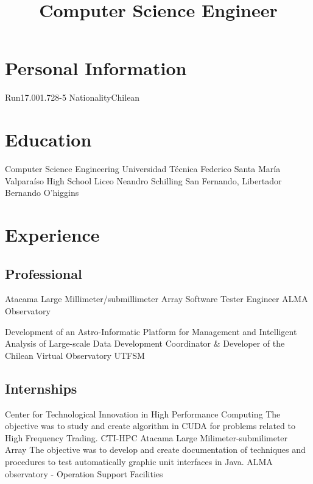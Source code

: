 \documentclass[11pt,a4paper]{moderncv}
\title{Computer Science Engineer}
\begin{document}
\maketitle

\section{Personal Information}
		{Run}{17.001.728-5}
						{Nationality}{Chilean}
							{}{}

\section{Education}
	{Computer Science Engineering}
	{Universidad Técnica Federico Santa María}
	{Valparaíso}
	{}
	{}
	{High School}
	{Liceo Neandro Schilling}
	{San Fernando, Libertador Bernando O'higgins}
	{}{}
\vspace{0.5cm}

\section{Experience}
\subsection{Professional}
	{Atacama Large Millimeter/submillimeter Array}
	{Software Tester Engineer}
	{ALMA Observatory}
	{}{}

	{Development of an Astro-Informatic Platform for Management and Intelligent Analysis of Large-scale Data}
	{Development Coordinator \& Developer of the Chilean Virtual Observatory}
	{UTFSM}
	{}{}

\subsection{Internships}
	{Center for Technological Innovation in High Performance Computing}
	{The objective was to study and create algorithm in CUDA for problems related to High Frequency Trading.}
	{CTI-HPC}
	{}{}
	{Atacama Large Milimeter-submilimeter Array}
	{The objective was to develop and create documentation of techniques and
	procedures to test automatically graphic unit interfaces in Java.}
	{ALMA observatory - Operation Support Facilities}
	{}{}
\end{document}
